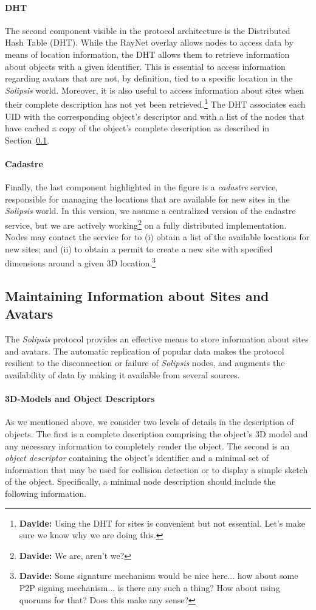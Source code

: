 \documentclass{article}
\newcommand{\df}[1]{\footnote{\textbf{Davide: }#1}}
\newcommand{\sol}{\emph{Solipsis}\xspace}
\begin{document}
\paragraph{DHT}
The second component visible in the protocol architecture is the
Distributed Hash Table (DHT). While the RayNet overlay allows nodes to
access data by means of location information, the DHT allows them to
retrieve information about objects with a given identifier. This is
essential to access information regarding avatars that are not, by
definition, tied to a specific location in the \sol world. Moreover,
it is also useful to access information about sites when their
complete description has not yet been retrieved.\df{Using the DHT for
  sites is convenient but not essential. Let's make sure we know why
  we are doing this.}  The DHT associates each UID with the
corresponding object's descriptor and with a list of the nodes that
have cached a copy of the object's complete description as described
in Section~\ref{sec:stor-inform-about}.

\paragraph{Cadastre}
Finally, the last component highlighted in the figure is a
\emph{cadastre} service, responsible for managing the locations that
are available for new sites in the \sol world. In this version, we
assume a centralized version of the cadastre service, but we are
actively working\df{We are, aren't we?} on a fully distributed
implementation. Nodes may contact the service for to (i) obtain a list
of the available locations for new sites; and (ii) to obtain a permit
to create a new site with specified dimensions around a given 3D
location.\df{Some signature mechanism would be nice here... how about
  some P2P signing mechanism... is there any such a thing? How about
  using quorums for that? Does this make any sense?}

\subsection{Maintaining Information about Sites and Avatars}
\label{sec:stor-inform-about}
The \sol protocol provides an effective means to store information
about sites and avatars. The automatic replication of popular data
makes the protocol resilient to the disconnection or failure of \sol
nodes, and augments the availability of data by making it available
from several sources.

\paragraph{3D-Models and Object Descriptors}
As we mentioned above, we consider two levels of details in the
description of objects. The first is a complete description comprising
the object's 3D model and any necessary information to completely
render the object. The second is an \emph{object descriptor}
containing the object's identifier and a minimal set of information
that may be used for collision detection or to display a simple sketch
of the object. Specifically, a minimal node description should include
the following information. 
\end{document}
